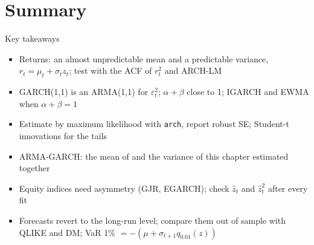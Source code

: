 \section{Summary}

\begin{frame}{Key takeaways}
\itemsize{\small}
\begin{itemize}
    \item Returns: an almost unpredictable mean and a predictable variance, $r_t = \mu_t + \sigma_t z_t$; test with the ACF of $r_t^2$ and ARCH-LM
    \item GARCH(1,1) is an ARMA(1,1) for $\varepsilon_t^2$; $\alpha + \beta$ close to 1; IGARCH and EWMA when $\alpha + \beta = 1$
    \item Estimate by maximum likelihood with \texttt{arch}, report robust SE; Student-t innovations for the tails
    \item ARMA-GARCH: the mean of  and the variance of this chapter estimated together
    \item Equity indices need asymmetry (GJR, EGARCH); check $\hat z_t$ and $\hat z_t^2$ after every fit
    \item Forecasts revert to the long-run level; compare them out of sample with QLIKE and DM; VaR 1\% $= -(\mu + \sigma_{t+1}q_{0.01}(z))$
\end{itemize}
\end{frame}

